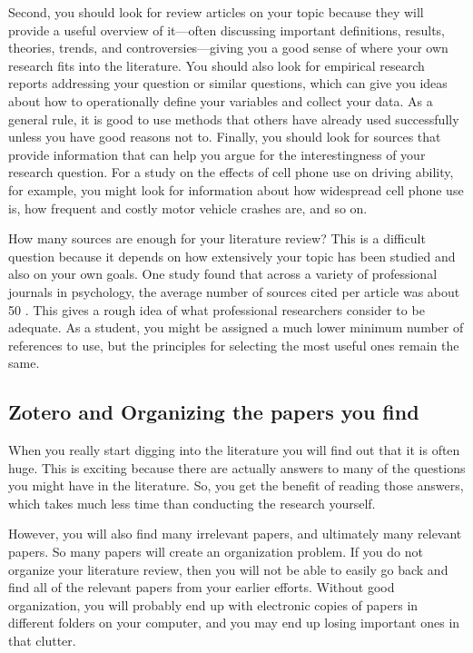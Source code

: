 Second, you should look for review articles on your topic because they will provide a useful overview of it---often discussing important definitions, results, theories, trends, and controversies---giving you a good sense of where your own research fits into the literature. You should also look for empirical research reports addressing your question or similar questions, which can give you ideas about how to operationally define your variables and collect your data. As a general rule, it is good to use methods that others have already used successfully unless you have good reasons not to. Finally, you should look for sources that provide information that can help you argue for the interestingness of your research question. For a study on the effects of cell phone use on driving ability, for example, you might look for information about how widespread cell phone use is, how frequent and costly motor vehicle crashes are, and so on.

How many sources are enough for your literature review? This is a difficult question because it depends on how extensively your topic has been studied and also on your own goals. One study found that across a variety of professional journals in psychology, the average number of sources cited per article was about 50 \citep{adair_explosion_2003}. This gives a rough idea of what professional researchers consider to be adequate. As a student, you might be assigned a much lower minimum number of references to use, but the principles for selecting the most useful ones remain the same.

\subsection{Zotero and Organizing the papers you find}

When you really start digging into the literature you will find out that it is often huge. This is exciting because there are actually answers to many of the questions you might have in the literature. So, you get the benefit of reading those answers, which takes much less time than conducting the research yourself.

However, you will also find many irrelevant papers, and ultimately many relevant papers. So many papers will create an organization problem. If you do not organize your literature review, then you will not be able to easily go back and find all of the relevant papers from your earlier efforts. Without good organization, you will probably end up with electronic copies of papers in different folders on your computer, and you may end up losing important ones in that clutter.


